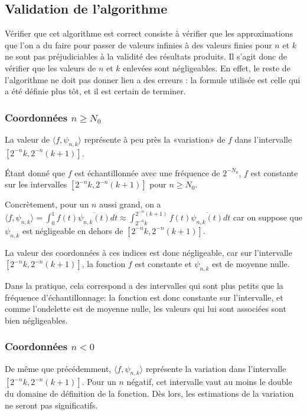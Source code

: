 \subsection{Validation de l'algorithme}

Vérifier que cet algorithme est correct consiste à vérifier que les approximations que l'on a du faire pour passer de valeurs infinies à des valeurs finies pour $n$ et $k$ ne sont pas préjudiciables à la validité des résultats produits. Il s'agit donc de vérifier que les valeurs de $n$ et $k$ enlevées sont négligeables. En effet,  le reste de l'algorithme ne doit pas donner lieu a des erreurs : la formule utilisée est celle qui a été définie plus tôt, et il est certain de terminer. 

\subsubsection{Coordonnées $n\geqslant N_0$}

La valeur de $\langle f,\psi_{n,k}\rangle$ représente à peu près la «variation» de $f$ dans l'intervalle $[2^{-n}k,2^{-n}(k+1)]$.

Étant donné que $f$ est échantillonnée avec une fréquence de $2^{-N_0}$, $f$ est constante sur les intervalles $[2^{-n}k,2^{-n}(k+1)]$ pour $n\geqslant N_0$.

Concrètement, pour un $n$ aussi grand, on a $\langle f,\psi_{n,k}\rangle = \int_0^1 f(t) \overline{\psi_{n, k}(t)}dt \approx \int_{2^{-n}k}^{2^{-n}(k+1)} f(t) \overline{\psi_{n, k}(t)}dt$ car on suppose que $\psi_{n,k}$ est négligeable en dehors de $[2^{-n}k,2^{-n}(k+1)]$.

La valeur des coordonnées à ces indices est donc négligeable, car sur l'intervalle $[2^{-n}k,2^{-n}(k+1)]$, la fonction $f$ est constante et $\psi_{n,k}$ est de moyenne nulle.

Dans la pratique, cela correspond a des intervalles qui sont plus petits que la fréquence d'échantillonnage: la fonction est donc constante sur l'intervalle, et comme l'ondelette est de moyenne nulle, les valeurs qui lui sont associées sont bien négligeables. 


\subsubsection{Coordonnées $n < 0$}

De même que précédemment, $\langle f,\psi_{n,k}\rangle$ représente la variation dans l'intervalle $[2^{-n}k,2^{-n}(k+1)]$. Pour un $n$ négatif, cet intervalle vaut au moins le double du domaine de définition de la fonction. Dès lors, les estimations de la variation ne seront pas significatifs.



